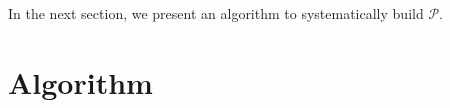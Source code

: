 \documentclass[graybox]{svmult}
\newcommand{\PathSet}{\ensuremath{\mathcal P} }
\begin{document}
In the next section, we present an algorithm to systematically build $\PathSet$.

\section{Algorithm}

\begin{algorithm}

\end{algorithm}



\end{document}
